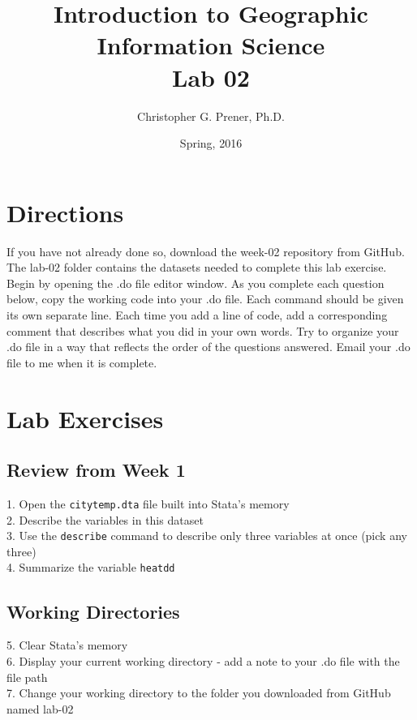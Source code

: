 \documentclass[letterpaper,11pt]{article}
\title{Introduction to Geographic Information Science \\ \large Lab 02}
\author{Christopher G. Prener, Ph.D.}
\date{Spring, 2016}
\begin{document}
\maketitle %
\section*{Directions}
If you have not already done so, download the week-02 repository from GitHub. The lab-02 folder contains the datasets needed to complete this lab exercise. Begin by opening the .do file editor window. As you complete each question below, copy the working code into your .do file. Each command should be given its own separate line. Each time you add a line of code, add a corresponding comment that describes what you did in your own words. Try to organize your .do file in a way that reflects the order of the questions answered. Email your .do file to me when it is complete.

\section*{Lab Exercises}
\subsection*{Review from Week 1}
1. Open the \texttt{citytemp.dta} file built into Stata's memory \\
2. Describe the variables in this dataset \\
3. Use the \texttt{describe} command to describe only three variables at once (pick any three) \\
4. Summarize the variable \texttt{heatdd} \\

\subsection*{Working Directories}
5. Clear Stata's memory \\
6. Display your current working directory - add a note to your .do file with the file path \\
7. Change your working directory to the folder you downloaded from GitHub named lab-02 \\
\end{document}
